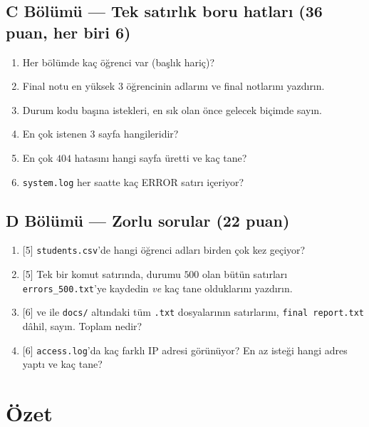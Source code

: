 \subsection*{C Bölümü --- Tek satırlık boru hatları (36 puan, her biri 6)}
\begin{enumerate}[leftmargin=2.2em,label=\textbf{C\arabic*}]
  \item Her bölümde kaç öğrenci var (başlık hariç)?
  \item Final notu en yüksek $3$ öğrencinin adlarını ve final notlarını yazdırın.
  \item Durum kodu başına istekleri, en sık olan önce gelecek biçimde sayın.
  \item En çok istenen $3$ sayfa hangileridir?
  \item En çok $404$ hatasını hangi sayfa üretti ve kaç tane?
  \item \texttt{system.log} her saatte kaç ERROR satırı içeriyor?
\end{enumerate}

\subsection*{D Bölümü --- Zorlu sorular (22 puan)}
\begin{enumerate}[leftmargin=2.2em,label=\textbf{D\arabic*}]
  \item {[5]} \texttt{students.csv}'de hangi öğrenci adları birden çok kez geçiyor?
  \item {[5]} Tek bir komut satırında, durumu $500$ olan bütün satırları \texttt{errors\_500.txt}'ye kaydedin \emph{ve} kaç tane olduklarını yazdırın.
  \item {[6]}  ve  ile \texttt{docs/} altındaki tüm \texttt{.txt} dosyalarının satırlarını, \texttt{final report.txt} dâhil, sayın. Toplam nedir?
  \item {[6]} \texttt{access.log}'da kaç farklı IP adresi görünüyor? En az isteği hangi adres yaptı ve kaç tane?
\end{enumerate}

\section{Özet}

